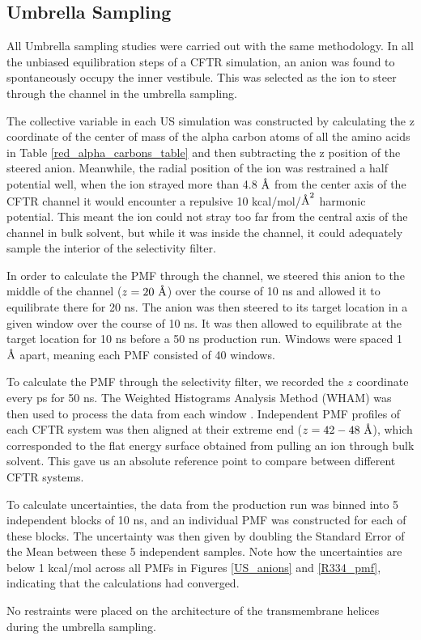 \subsection{Umbrella Sampling}
All Umbrella sampling studies were carried out with the same methodology. In all the unbiased equilibration steps of a CFTR simulation, an anion was found to spontaneously occupy the inner vestibule. This was selected as the ion to steer through the channel in the umbrella sampling.

The collective variable in each US simulation was constructed by calculating the z coordinate of the center of mass of the alpha carbon atoms of all the amino acids in Table \ref{red_alpha_carbons_table} and then subtracting the z position of the steered anion. Meanwhile, the radial position of the ion was restrained a half potential well, when the ion strayed more than 4.8 $\textup{\AA}$ from the center axis of the CFTR channel it would encounter a repulsive 10 kcal/mol/$\textup{\AA}^2$ harmonic potential. This meant the ion could not stray too far from the central axis of the channel in bulk solvent, but while it was inside the channel, it could adequately sample the interior of the selectivity filter.

In order to calculate the PMF through the channel, we steered this anion to the middle of the channel ($z=20~\textup{\AA}$) over the course of 10 ns and allowed it to equilibrate there for 20 ns. The anion was then steered to its target location in a given window over the course of 10 ns. It was then allowed to equilibrate at the target location for 10 ns before a 50 ns production run. Windows were spaced 1 $\textup{\AA}$ apart, meaning each PMF consisted of 40 windows.

To calculate the PMF through the selectivity filter, we recorded the $z$ coordinate every ps for 50 ns. The Weighted Histograms Analysis Method (WHAM) was then used to process the data from each window \cite{grossfield2012}. Independent PMF profiles of each CFTR system was then aligned at their extreme end ($z=42-48~\textup{\AA}$), which corresponded to the flat energy surface obtained from pulling an ion through bulk solvent. This gave us an absolute reference point to compare between different CFTR systems. 

To calculate uncertainties, the data from the production run was binned into 5 independent blocks of 10 ns, and an individual PMF was constructed for each of these blocks. The uncertainty was then given by doubling the Standard Error of the Mean between these 5 independent samples. Note how the uncertainties are below 1 kcal/mol across all PMFs in Figures \ref{US_anions} and \ref{R334_pmf}, indicating that the calculations had converged.

No restraints were placed on the architecture of the transmembrane helices during the umbrella sampling.

